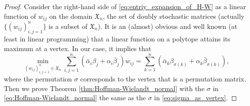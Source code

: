 \documentclass[11pt, a4paper]{article}
\numberwithin{equation}{section}
\newcommand{\doublystochastic}{\mathfrak{X}}
\theoremstyle{definition}
\theoremstyle{remark}
\begin{document}
\begin{proof}
  Consider the right-hand side of \eqref{eq:entriy_expansion_of_H-W} as a linear function of $w_{ij}$ on the domain $\doublystochastic_n$, the set of doubly stochastic matrices (actually $\{ (w_{ij})^n_{i, j = 1} \}$ is a subset of $\doublystochastic_n$). It is an (almost) obvious and well known (at least in linear programming) that a linear function on a polytope attains its maximum at a vertex. In our case, it implies that
  \begin{equation} \label{eq:sigma_as_vertex}
    \min_{(w_{ij})^n_{i, j = 1} \in \doublystochastic_n} \sum^n_{i, j = 1} (\bar{\alpha}_i \beta_j + \alpha_i \bar{\beta}_j) w_{ij} = \sum^n_{k = 1} (\bar{\alpha}_k \beta_{\sigma(k)} + \alpha_k \bar{\beta}_{\sigma(k)}),
  \end{equation}
  where the permutation $\sigma$ corresponds to the vertex that is a permutation matrix. Then we prove Theorem \ref{thm:Hoffman-Wielandt_normal} with the $\sigma$ in \eqref{eq:Hoffman-Wielandt_normal} the same as the $\sigma$ in \eqref{eq:sigma_as_vertex}.
\end{proof}



\end{document}
